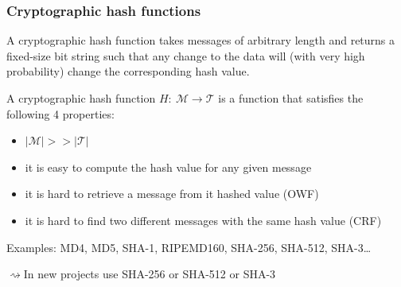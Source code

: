 \documentclass[aspectratio=169, lualatex, handout, 10pt,dvipsnames,svgnames]{beamer} %
\def\envert#1{\textcolor{vert}{#1}}
\def\enrouge#1{\textcolor{rouge}{#1}}
\newcommand{\Mcal}{\mathcal{M}}
\newcommand{\Tcal}{\mathcal{T}}
\begin{document}
\begin{frame}

  \frametitle{Cryptographic hash functions}

  A cryptographic hash function takes messages of arbitrary length and returns a fixed-size bit string such that any change to the data will (with very high probability) change the corresponding hash value.

  \begin{definition}
    A cryptographic hash function $H:\ \Mcal \rightarrow \Tcal$ is a function that satisfies the following 4 properties:
    \begin{itemize}
    \item $|\Mcal| >> |\Tcal|$
    \item it is easy to compute the hash value for any given message 
    \item it is hard to retrieve a message from it hashed value (OWF)
    \item it is hard to find two different messages with the same hash value (CRF)
    \end{itemize}
  \end{definition}
  \medskip{}
  
  \envert{Examples: MD4, MD5, SHA-1, RIPEMD160, SHA-256, SHA-512, SHA-3\dots}\medskip

  \enrouge{$\rightsquigarrow$In new projects use SHA-256 or SHA-512 or SHA-3}

  

  
\end{frame}
\end{document}
